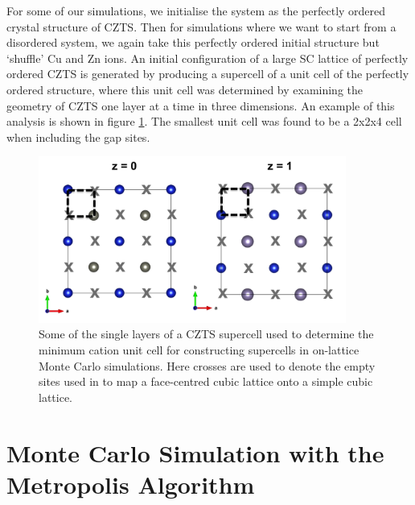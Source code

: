 For some of our simulations, we initialise the system as the perfectly ordered crystal structure of CZTS. Then for simulations where we want to start from a disordered system, we again take this perfectly ordered initial structure but `shuffle' Cu and Zn ions. An initial configuration of a large SC lattice of perfectly ordered CZTS is generated by producing a supercell of a unit cell of the perfectly ordered structure, where this unit cell was determined by examining the geometry of CZTS one layer at a time in three dimensions. An example of this analysis is shown in figure \ref{unit_cell_eris_supercell}. The smallest unit cell was found to be a 2x2x4 cell when including the gap sites. 

\begin{figure}[h!]
  \centering
    \includegraphics[width=0.9\textwidth]{figures/unit_cell_eris_supercell.png}
    \caption{Some of the single layers of a CZTS supercell used to determine the minimum cation unit cell for constructing supercells in on-lattice Monte Carlo simulations. Here crosses are used to denote the empty sites used in to map a face-centred cubic lattice onto a simple cubic lattice.}
  \label{unit_cell_eris_supercell}
\end{figure}


\section{Monte Carlo Simulation with the Metropolis Algorithm}

